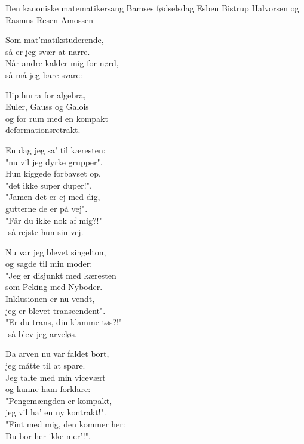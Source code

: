 \begin{song}{Den kanoniske matematikersang}
  {} %
  {Bamses fødselsdag}
  {Esben Bistrup Halvorsen og Rasmus Resen Amossen}
  {}
  {\NotCCLIed}

  \begin{SBVerse}
	Som mat'matikstuderende,\\
	så er jeg svær at narre.\\
	Når andre kalder mig for nørd,\\
	så må jeg bare svare:
  \end{SBVerse}

  \begin{SBChorus}
	Hip hurra for algebra,\\
	Euler, Gauss og Galois\\
	og for rum med en kompakt\\
	deformationsretrakt.
  \end{SBChorus}

  \begin{SBVerse}
	En dag jeg sa' til kæresten:\\
	"nu vil jeg dyrke grupper".\\
	Hun kiggede forbavset op,\\
	"det ikke super duper!".\\\medskip
	"Jamen det er ej med dig,\\
	gutterne de er på vej".\\
	"Får du ikke nok af mig?!"\\
	 -så rejste hun sin vej.\\
  \end{SBVerse}

  \begin{SBVerse}
	Nu var jeg blevet singelton,\\
	og sagde til min moder:\\
	"Jeg er disjunkt med kæresten\\
	som Peking med Nyboder.\\\medskip
	Inklusionen er nu vendt,\\
	jeg er blevet transcendent".\\
	"Er du trans, din klamme tøs?!"\\
	-så blev jeg arveløs.
  \end{SBVerse}

  \begin{SBVerse}
	Da arven nu var faldet bort,\\
	jeg måtte til at spare.\\
	Jeg talte med min vicevært\\
	og kunne ham forklare:\\\medskip
	"Pengemængden er kompakt,\\
	jeg vil ha' en ny kontrakt!".\\
	"Fint med mig, den kommer her:\\
	Du bor her ikke mer'!".
  \end{SBVerse}


\end{song}
